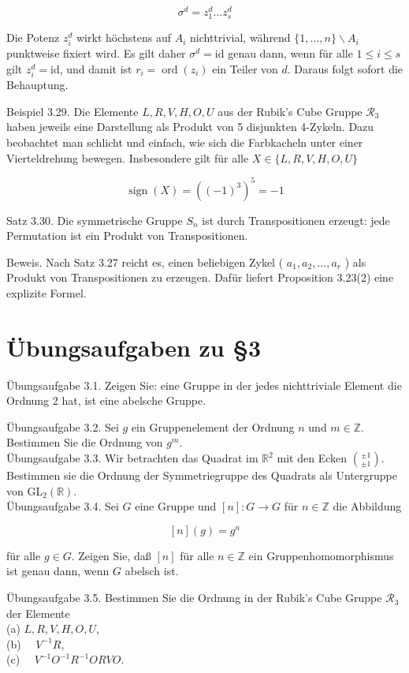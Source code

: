 \documentclass[10pt, letterpaper]{article}
\begin{document}
$$
\sigma^{d}=z_{1}^{d} \ldots z_{s}^{d}
$$

Die Potenz $z_{i}^{d}$ wirkt höchstens auf $A_{i}$ nichttrivial, während $\{1, \ldots, n\} \backslash A_{i}$ punktweise fixiert wird. Es gilt daher $\sigma^{d}=\mathrm{id}$ genau dann, wenn für alle $1 \leq i \leq s$ gilt $z_{i}^{d}=\mathrm{id}$, und damit ist $r_{i}=\operatorname{ord}\left(z_{i}\right)$ ein Teiler von $d$. Daraus folgt sofort die Behauptung.

Beispiel 3.29. Die Elemente $L, R, V, H, O, U$ aus der Rubik's Cube Gruppe $\mathscr{R}_{3}$ haben jeweils eine Darstellung als Produkt von 5 disjunkten 4-Zykeln. Dazu beobachtet man schlicht und einfach, wie sich die Farbkacheln unter einer Vierteldrehung bewegen. Insbesondere gilt für alle $X \in\{L, R, V, H, O, U\}$

$$
\operatorname{sign}(X)=\left((-1)^{3}\right)^{5}=-1
$$

Satz 3.30. Die symmetrische Gruppe $S_{n}$ ist durch Transpositionen erzeugt: jede Permutation ist ein Produkt von Transpositionen.

Beweis. Nach Satz 3.27 reicht es, einen beliebigen Zykel ( $a_{1}, a_{2}, \ldots, a_{r}$ ) als Produkt von Transpositionen zu erzeugen. Dafür liefert Proposition 3.23(2) eine explizite Formel.

\section*{Übungsaufgaben zu §3}
Übungsaufgabe 3.1. Zeigen Sie: eine Gruppe in der jedes nichttriviale Element die Ordnung 2 hat, ist eine abelsche Gruppe.

Übungsaufgabe 3.2. Sei $g$ ein Gruppenelement der Ordnung $n$ und $m \in \mathbb{Z}$. Bestimmen Sie die Ordnung von $g^{m}$.\\
Übungsaufgabe 3.3. Wir betrachten das Quadrat im $\mathbb{R}^{2}$ mit den Ecken $\binom{ \pm 1}{ \pm 1}$. Bestimmen sie die Ordnung der Symmetriegruppe des Quadrats als Untergruppe von $\mathrm{GL}_{2}(\mathbb{R})$.\\
Übungsaufgabe 3.4. Sei $G$ eine Gruppe und $[n]: G \rightarrow G$ für $n \in \mathbb{Z}$ die Abbildung

$$
[n](g)=g^{n}
$$

für alle $g \in G$. Zeigen Sie, daß $[n]$ für alle $n \in \mathbb{Z}$ ein Gruppenhomomorphismus ist genau dann, wenn $G$ abelsch ist.

Übungsaufgabe 3.5. Bestimmen Sie die Ordnung in der Rubik's Cube Gruppe $\mathscr{R}_{3}$ der Elemente\\
(a) $L, R, V, H, O, U$,\\
(b) $\quad V^{-1} R$,\\
(c) $\quad V^{-1} O^{-1} R^{-1} O R V O$.
\end{document}
